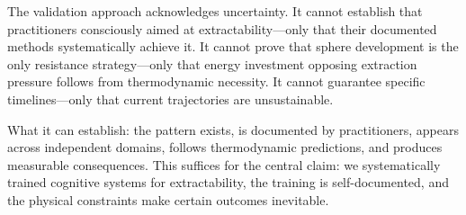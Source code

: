 The validation approach acknowledges uncertainty. It cannot establish that practitioners consciously aimed at extractability---only that their documented methods systematically achieve it. It cannot prove that sphere development is the only resistance strategy---only that energy investment opposing extraction pressure follows from thermodynamic necessity. It cannot guarantee specific timelines---only that current trajectories are unsustainable.

What it can establish: the pattern exists, is documented by practitioners, appears across independent domains, follows thermodynamic predictions, and produces measurable consequences. This suffices for the central claim: we systematically trained cognitive systems for extractability, the training is self-documented, and the physical constraints make certain outcomes inevitable.
